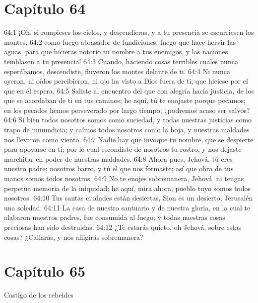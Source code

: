 \section*{Capítulo 64 }
 
64:1 ¡Oh, si rompieses los cielos, y descendieras, y a tu presencia se escurriesen los montes, 
64:2 como fuego abrasador de fundiciones, fuego que hace hervir las aguas, para que hicieras notorio tu nombre a tus enemigos, y las naciones temblasen a tu presencia! 
64:3 Cuando, haciendo cosas terribles cuales nunca esperábamos, descendiste, fluyeron los montes delante de ti. 
64:4 Ni nunca oyeron, ni oídos percibieron, ni ojo ha visto a Dios fuera de ti, que hiciese por el que en él espera. 
64:5 Saliste al encuentro del que con alegría hacía justicia, de los que se acordaban de ti en tus caminos; he aquí, tú te enojaste porque pecamos; en los pecados hemos perseverado por largo tiempo; ¿podremos acaso ser salvos? 
64:6 Si bien todos nosotros somos como suciedad, y todas nuestras justicias como trapo de inmundicia; y caímos todos nosotros como la hoja, y nuestras maldades nos llevaron como viento. 
64:7 Nadie hay que invoque tu nombre, que se despierte para apoyarse en ti; por lo cual escondiste de nosotros tu rostro, y nos dejaste marchitar en poder de nuestras maldades. 
64:8 Ahora pues, Jehová, tú eres nuestro padre; nosotros barro, y tú el que nos formaste; así que obra de tus manos somos todos nosotros. 
64:9 No te enojes sobremanera, Jehová, ni tengas perpetua memoria de la iniquidad; he aquí, mira ahora, pueblo tuyo somos todos nosotros. 
64:10 Tus santas ciudades están desiertas, Sion es un desierto, Jerusalén una soledad. 
64:11 La casa de nuestro santuario y de nuestra gloria, en la cual te alabaron nuestros padres, fue consumida al fuego; y todas nuestras cosas preciosas han sido destruidas. 
64:12 ¿Te estarás quieto, oh Jehová, sobre estas cosas? ¿Callarás, y nos afligirás sobremanera? 
\section*{Capítulo 65 }
Castigo de los rebeldes 
 
